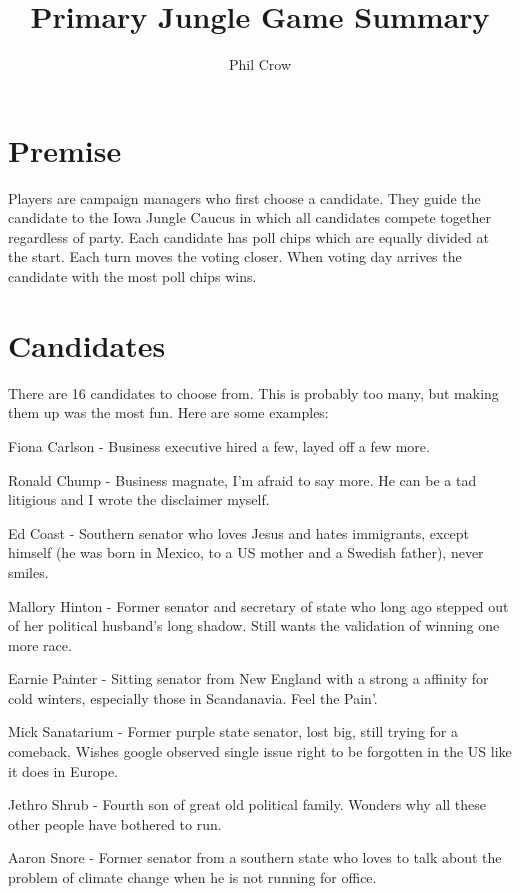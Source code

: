 \documentclass[twocolumn]{article}
\begin{document}
\title{Primary Jungle Game Summary}
\author{Phil Crow}
\maketitle

\section{Premise}

Players are campaign managers who first choose a candidate. They guide the candidate to the Iowa Jungle Caucus in which all candidates compete together
regardless of party. Each candidate has poll chips which are equally divided at the start. Each turn moves the voting closer. When voting day arrives the
candidate with the most poll chips wins.

\section{Candidates}

There are 16 candidates to choose from. This is probably too many, but making them up was the most fun. Here are some examples:

Fiona Carlson     - Business executive hired a few, layed off a few more.

Ronald Chump      - Business magnate, I'm afraid to say more. He can be a tad litigious and I wrote the disclaimer myself.

Ed Coast          - Southern senator who loves Jesus and hates immigrants, except himself (he was born in Mexico, to a US mother and a Swedish father), never smiles.

Mallory Hinton    - Former senator and secretary of state who long ago stepped out of her political husband's long shadow. Still wants the validation of winning one more race.

Earnie Painter - Sitting senator from New England with a strong a affinity for cold winters, especially those in Scandanavia. Feel the Pain'.

Mick Sanatarium   - Former purple state senator, lost big, still trying for a comeback. Wishes google observed single issue right to be forgotten in the US like it does in Europe.

Jethro Shrub      - Fourth son of great old political family. Wonders why all these other people have bothered to run.

Aaron Snore - Former senator from a southern state who loves to talk about the problem of climate change when he is not running for office.
\end{document}
